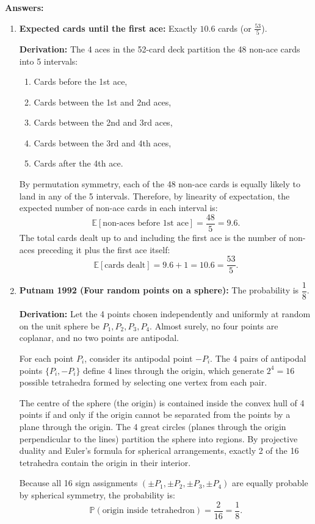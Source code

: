 \documentclass[12pt]{article}
\begin{document}
\textbf{Answers:}
\begin{enumerate}[label=(\alph*)]
    \item \textbf{Expected cards until the first ace:} Exactly $10.6$ cards (or $\frac{53}{5}$).

    \textbf{Derivation:}
    The 4 aces in the 52-card deck partition the 48 non-ace cards into 5 intervals:
    \begin{enumerate}[label=\arabic*.]
        \item Cards before the 1st ace,
        \item Cards between the 1st and 2nd aces,
        \item Cards between the 2nd and 3rd aces,
        \item Cards between the 3rd and 4th aces,
        \item Cards after the 4th ace.
    \end{enumerate}
    By permutation symmetry, each of the 48 non-ace cards is equally likely to land in any of the 5 intervals.
    Therefore, by linearity of expectation, the expected number of non-ace cards in each interval is:
    \[
    \mathbb{E}[\text{non-aces before 1st ace}] = \frac{48}{5} = 9.6.
    \]
    The total cards dealt up to and including the first ace is the number of non-aces preceding it plus the first ace itself:
    \[
    \mathbb{E}[\text{cards dealt}] = 9.6 + 1 = 10.6 = \frac{53}{5}.
    \]

    \item \textbf{Putnam 1992 (Four random points on a sphere):} The probability is $\dfrac{1}{8}$.

    \textbf{Derivation:}
    Let the 4 points chosen independently and uniformly at random on the unit sphere be $P_1, P_2, P_3, P_4$.
    Almost surely, no four points are coplanar, and no two points are antipodal.

    For each point $P_i$, consider its antipodal point $-P_i$. The 4 pairs of antipodal points $\{P_i, -P_i\}$ define 4 lines through the origin, which generate $2^4 = 16$ possible tetrahedra formed by selecting one vertex from each pair.

    The centre of the sphere (the origin) is contained inside the convex hull of 4 points if and only if the origin cannot be separated from the points by a plane through the origin. The 4 great circles (planes through the origin perpendicular to the lines) partition the sphere into regions. By projective duality and Euler's formula for spherical arrangements, exactly 2 of the 16 tetrahedra contain the origin in their interior.

    Because all 16 sign assignments $(\pm P_1, \pm P_2, \pm P_3, \pm P_4)$ are equally probable by spherical symmetry, the probability is:
    \[
    \mathbb{P}(\text{origin inside tetrahedron}) = \frac{2}{16} = \frac{1}{8}.
    \]
\end{enumerate}
\end{document}
